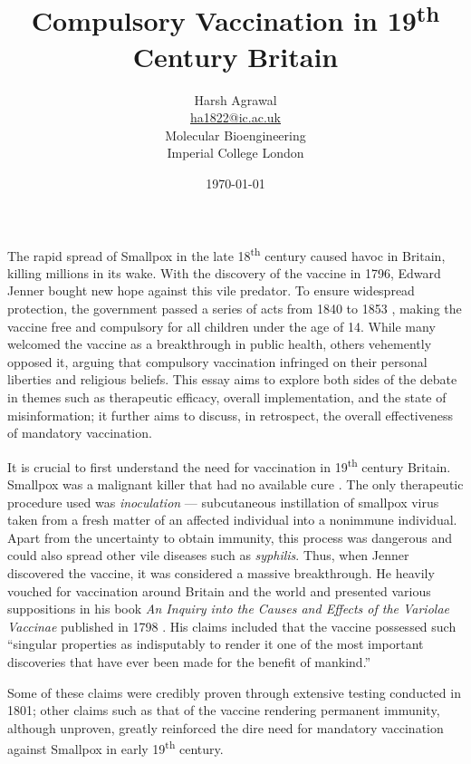 \documentclass{article}
\title{Compulsory Vaccination in 19\textsuperscript{th} Century Britain}
\author{Harsh Agrawal \\ \href{ha1822@ic.ac.uk}{ha1822@ic.ac.uk} \\ Molecular Bioengineering \\ Imperial College London}
\date{\today}
\begin{document}
\maketitle

The rapid spread of Smallpox in the late 18\textsuperscript{th} century caused
havoc in Britain, killing millions in its wake. With the discovery of the
vaccine in 1796, Edward Jenner bought new hope against this vile predator. To
ensure widespread protection, the government passed a series of acts from 1840
to 1853 \citep{fenner_1988}, making the vaccine free and compulsory for all
children under the age of 14. While many welcomed the vaccine as a breakthrough
in public health, others vehemently opposed it, arguing that compulsory
vaccination infringed on their personal liberties and religious beliefs. This
essay aims to explore both sides of the debate in themes such as therapeutic
efficacy, overall implementation, and the state of misinformation; it further
aims to discuss, in retrospect, the overall effectiveness of mandatory
vaccination.

It is crucial to first understand the need for vaccination in
19\textsuperscript{th} century Britain. Smallpox was a malignant killer that
had no available cure \citep{millward_2019}. The only therapeutic procedure
used was \textit{inoculation} --- subcutaneous instillation of smallpox virus
taken from a fresh matter of an affected individual into a nonimmune
individual. Apart from the uncertainty to obtain immunity, this process was
dangerous and could also spread other vile diseases such as \textit{syphilis}.
Thus, when Jenner discovered the vaccine, it was considered a massive
breakthrough. He heavily vouched for vaccination around Britain and the world
and presented various suppositions in his book \textit{An Inquiry into the
    Causes and Effects of the Variolae Vaccinae} published in 1798
\citep{jenner_2012}. His claims included that the vaccine possessed such
``singular properties as indisputably to render it one of the most important
discoveries that have ever been made for the benefit of mankind.\textquote''

Some of these claims were credibly proven through extensive testing conducted
in 1801\citep{WHO}; other claims such as that of the vaccine rendering
permanent immunity, although unproven, greatly reinforced the dire need for
mandatory vaccination against Smallpox in early 19\textsuperscript{th} century.
\end{document}
